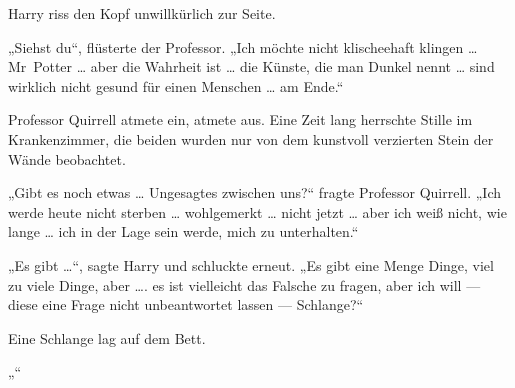 Harry riss den Kopf unwillkürlich zur Seite.

„Siehst du“, flüsterte der Professor.
„Ich möchte nicht klischeehaft klingen … Mr~Potter … aber die Wahrheit ist … die Künste, die man Dunkel nennt … sind wirklich nicht gesund für einen Menschen … am Ende.“

Professor Quirrell atmete ein, atmete aus. Eine Zeit lang herrschte Stille im Krankenzimmer, die beiden wurden nur von dem kunstvoll verzierten Stein der Wände beobachtet.

„Gibt es noch etwas … Ungesagtes zwischen uns?“ fragte Professor Quirrell.
„Ich werde heute nicht sterben … wohlgemerkt … nicht jetzt … aber ich weiß nicht, wie lange … ich in der Lage sein werde, mich zu unterhalten.“

„Es gibt …“, sagte Harry und schluckte erneut.
„Es gibt eine Menge Dinge, viel zu viele Dinge, aber …. es ist vielleicht das Falsche zu fragen, aber ich will — diese eine Frage nicht unbeantwortet lassen — Schlange?“

Eine Schlange lag auf dem Bett.

„“

